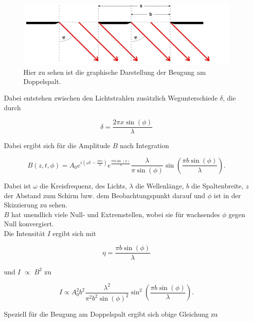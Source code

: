 \begin{figure}
    \centering
    \includegraphics[scale=0.5]{content/Doppelspalt.pdf}
    \caption{Hier zu sehen ist die graphische Darstellung der Beugung am Doppelspalt.}
    \label{fig:single}
\end{figure}

Dabei entstehen zwischen den Lichtstrahlen zusätzlich Wegunterschiede \(\delta\), die durch 

\begin{equation}
    \delta = \frac{2\pi x \sin(\phi)}{\lambda}
\end{equation}

Dabei ergibt sich für die Amplitude \(B\) nach Integration 

\begin{equation}
    B(z,t,\phi) = A_0 e^{i(\omega t - \frac{2\pi z}{\lambda})} e^{\frac{\pi ib\sin(\phi)}{\lambda}} \frac{\lambda}{\pi \sin(\phi)} \sin(\frac{\pi b\sin(\phi)}{\lambda}).
    \label{eq:es}
\end{equation}

Dabei ist \(\omega\) die Kreisfrequenz, des Lichts, \(\lambda\) die Wellenlänge, \(b\) die Spaltenbreite, \(z\) der Abstand zum Schirm bzw. dem Beobachtungspunkt darauf und \(\phi\) ist in der Skizzierung zu sehen.\\
\(B\) hat unendlich viele Null- und Extremstellen, wobei sie für wachsendes \(\phi\) gegen Null konvergiert.\\
Die Intensität \(I\) ergibt sich mit

\begin{equation}
    \eta = \frac{\pi b \sin(\phi)}{\lambda}
\end{equation}

und \(I\) \(\propto\) \(B^2\) zu

\begin{equation}
    I \propto A_0^2 b^2 \frac{\lambda^2}{\pi^2 b^2 \sin(\phi)^2} \sin^2(\frac{\pi b \sin(\phi)}{\lambda}).
\end{equation}

Speziell für die Beugung am Doppelspalt ergibt sich obige Gleichung zu

